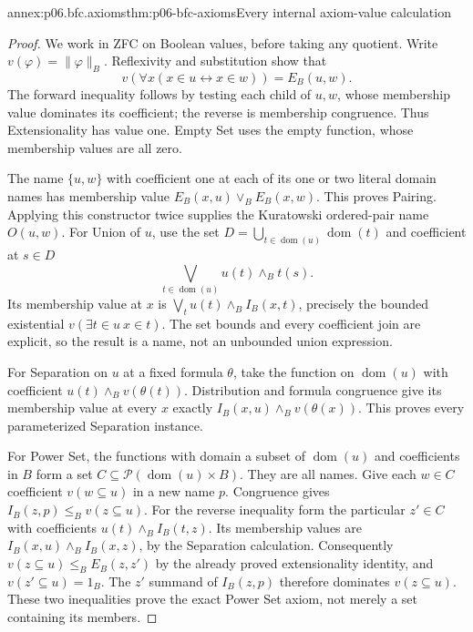 \begin{annexitem}{annex:p06.bfc.axioms}{thm:p06-bfc-axioms}{Every internal axiom-value calculation}
\begin{proof}
We work in ZFC on Boolean values, before taking any quotient.
Write \(v(\varphi)=\lVert\varphi\rVert_B\).
Reflexivity and substitution show that
\[
 v(\forall x(x\in u\leftrightarrow x\in w))=E_B(u,w).
\]
The forward inequality follows by testing each child of \(u,w\), whose
membership value dominates its coefficient; the reverse is membership
congruence. Thus Extensionality has value one. Empty Set uses the empty
function, whose membership values are all zero.

The name \(\{u,w\}\) with coefficient one at each of its one or two
literal domain names has membership value \(E_B(x,u)\vee_B E_B(x,w)\).
This proves Pairing. Applying this constructor twice supplies the
Kuratowski ordered-pair name \(O(u,w)\). For Union of \(u\), use the
set \(D=\bigcup_{t\in\operatorname{dom}(u)}\operatorname{dom}(t)\)
and coefficient at \(s\in D\)
\[
 \bigvee_{t\in\operatorname{dom}(u)}u(t)\wedge_B t(s).
\]
Its membership value at \(x\) is
\(\bigvee_t u(t)\wedge_B I_B(x,t)\), precisely the bounded existential
\(v(\exists t\in u\ x\in t)\). The set bounds and every coefficient
join are explicit, so the result is a name, not an unbounded union expression.

For Separation on \(u\) at a fixed formula \(\theta\), take the
function on \(\operatorname{dom}(u)\) with coefficient
\(u(t)\wedge_B v(\theta(t))\). Distribution and formula congruence
give its membership value at every \(x\) exactly
\(I_B(x,u)\wedge_B v(\theta(x))\). This proves every parameterized
Separation instance.

For Power Set, the functions with domain a subset of
\(\operatorname{dom}(u)\) and coefficients in \(B\) form a set
\(C\subseteq\mathcal P(\operatorname{dom}(u)\times B)\). They are
all names. Give each \(w\in C\) coefficient \(v(w\subseteq u)\)
in a new name \(p\). Congruence gives \(I_B(z,p)\leq_B v(z\subseteq u)\).
For the reverse inequality form the particular \(z'\in C\) with
coefficients \(u(t)\wedge_B I_B(t,z)\). Its membership values are
\(I_B(x,u)\wedge_B I_B(x,z)\), by the Separation calculation.
Consequently \(v(z\subseteq u)\leq_B E_B(z,z')\) by the already
proved extensionality identity, and \(v(z'\subseteq u)=1_B\).
The \(z'\) summand of \(I_B(z,p)\) therefore dominates
\(v(z\subseteq u)\). These two inequalities prove the exact Power Set
axiom, not merely a set containing its members.


\end{proof}
\end{annexitem}
